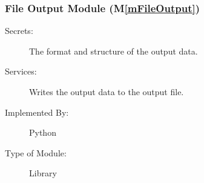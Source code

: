 \documentclass[12pt, titlepage]{article}
\newcommand{\mref}[1]{M\ref{#1}}
\begin{document}
\subsubsection{File Output Module (\mref{mFileOutput})}

\begin{description}
\item[Secrets:] The format and structure of the output data.
\item[Services:] Writes the output data to the output file.
\item[Implemented By:] Python
\item[Type of Module:] Library
\end{description}




\end{document}
